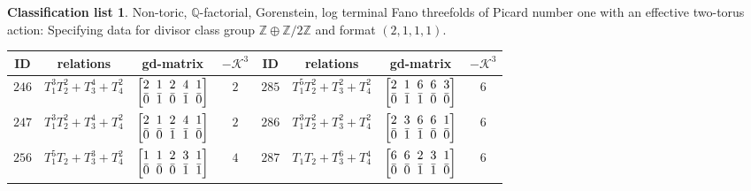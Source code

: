 \documentclass[pdftex]{sigma}%
\theoremstyle{definition}
\newtheorem{class-list}[thm]{Classification list}
\def\ZZ{{\mathbb Z}}
\def\QQ{{\mathbb Q}}
\numberwithin{equation}{section}
\begin{document}
\begin{class-list}
Non-toric, $\QQ$-factorial, Gorenstein, log terminal Fano
threefolds of Picard number one with an effective two-torus action:
Specifying data for divisor class group $\ZZ\oplus \ZZ/2\ZZ$ and
format $(2,1,1,1)$.
\begin{table}[h!]\centering\setlength{\tabcolsep}{3.5pt}
\renewcommand{\arraystretch}{1.25}\small\tabulinesep=1mm
\begin{tabu}{c|c|c|c||c|c|c|c}
\hline
ID&relations&gd-matrix&$-\mathcal{K}^3$&ID&relations&gd-matrix&$-\mathcal{K}^3$
\\
\hline
${246}$&${T_{1}^{3}T_{2}^{2}+T_{3}^{4}+T_{4}^{2}}$
&$\arraycolsep=1mm\begin{bmatrix}{2} & {1} & {2} & {4} & {1} \\ {\bar{0}} & {\bar{1}} & {\bar{0}} & {\bar{1}} & {\bar{0}}\end{bmatrix}$&${2}$
&${285}$&${T_{1}^{5}T_{2}^{2}+T_{3}^{2}+T_{4}^{2}}$
&$\arraycolsep=1mm\begin{bmatrix}{2} & {1} & {6} & {6} & {3} \\ {\bar{0}} & {\bar{1}} & {\bar{1}} & {\bar{0}} & {\bar{0}}\end{bmatrix}$&${6}$
\\
\hline
${247}$&${T_{1}^{3}T_{2}^{2}+T_{3}^{4}+T_{4}^{2}}$
&$\arraycolsep=1mm\begin{bmatrix}{2} & {1} & {2} & {4} & {1} \\ {\bar{0}} & {\bar{0}} & {\bar{1}} & {\bar{1}} & {\bar{0}}\end{bmatrix}$&${2}$
&${286}$&${T_{1}^{3}T_{2}^{2}+T_{3}^{2}+T_{4}^{2}}$
&$\arraycolsep=1mm\begin{bmatrix}{2} & {3} & {6} & {6} & {1} \\ {\bar{0}} & {\bar{1}} & {\bar{1}} & {\bar{0}} & {\bar{0}}\end{bmatrix}$&${6}$
\\
\hline
${256}$&${T_{1}^{5}T_{2}+T_{3}^{3}+T_{4}^{2}}$
&$\arraycolsep=1mm\begin{bmatrix}{1} & {1} & {2} & {3} & {1} \\ {\bar{0}} & {\bar{0}} & {\bar{0}} & {\bar{1}} & {\bar{1}}\end{bmatrix}$&${4}$
&${287}$&${T_{1}T_{2}+T_{3}^{6}+T_{4}^{4}}$
&$\arraycolsep=1mm\begin{bmatrix}{6} & {6} & {2} & {3} & {1} \\ {\bar{0}} & {\bar{0}} & {\bar{1}} & {\bar{1}} & {\bar{0}}\end{bmatrix}$&${6}$

\end{tabu}
\end{table}
\end{class-list}
\end{document}
